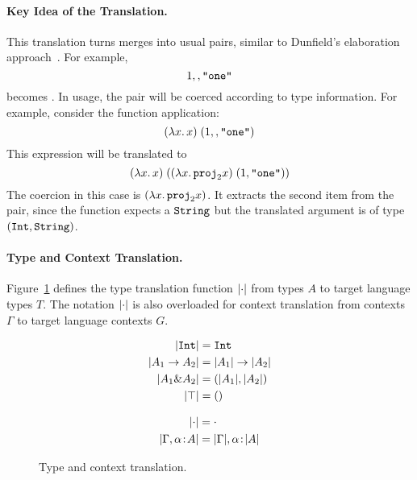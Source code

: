 \paragraph{Key Idea of the Translation.}
This translation turns merges into usual pairs, similar to Dunfield's
elaboration approach~\cite{dunfield2014elaborating}.
For example, \[ 1 \mergeop \code{"one"} \] becomes 
{}. In usage, the pair will be coerced according to type
information. For example, consider the function application: \[ \app {(\lamty x
{\code{String}} x)} {(1 \mergeop \code{"one"})} \] This expression will be translated to \[ \app
{(\lamty x {\code{String}} x)} {(\app {(\lamty x {\pair {\code{Int}} {\code{String}}} {\proj 2 x})}
{\pair 1 {\code{"one"}}})} \] The coercion in this case is $(\lamty x {\pair
{\code{Int}} {\code{String}}} {\proj 2 x})$. It extracts the second item from the pair, since
the function expects a $\code{String}$ but the translated argument is of type $\pair
{\code{Int}} {\code{String}}$.



\paragraph{Type and Context Translation.}

Figure~\ref{fig:type-and-context-translation} defines the type translation
function $\im \cdot$ from \name types $A$ to target language types $T$. The
notation $\im \cdot$ is also overloaded for context translation from \name
contexts $\Gamma$ to target language contexts $G$.

\begin{figure}[t]

  \begin{align*}
    \im {\code{Int}}     &= \code{Int} \\
    \im {A_1 \to A_2}    &= \im {A_1} \to \im {A_2} \\
    \im {A_1 \inter A_2} &= \pair {\im {A_1}} {\im {A_2}} \\
    \im \top             &= \unit \\
  \end{align*}


  \begin{align*}
    \im \cdot                      &= \cdot \\
    \im {\Gamma, \alpha \oftype A} &= \im \Gamma, \alpha \oftype \im A
  \end{align*}

  \caption{Type and context translation.}
  \label{fig:type-and-context-translation}
\end{figure}

